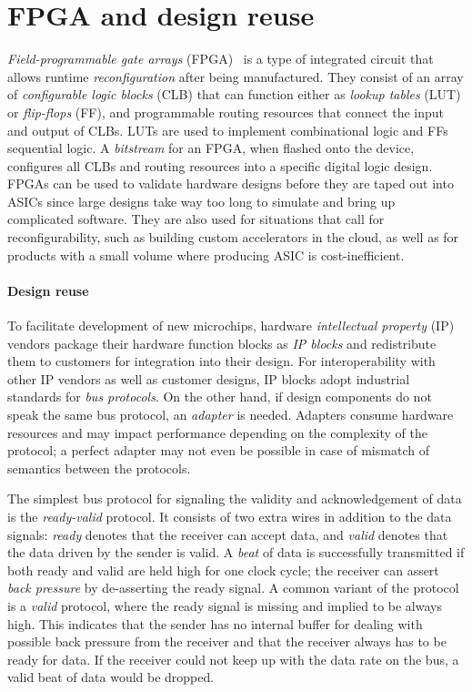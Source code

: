 \section{FPGA and design reuse} \label{sec:fpga-basics}

\emph{Field-programmable gate arrays} (FPGA)~\cite{brown_field-programmable_1992} is a type of integrated circuit that allows runtime \emph{reconfiguration} after being manufactured.  They consist of an array of \emph{configurable logic blocks} (CLB) that can function either as \emph{lookup tables} (LUT) or \emph{flip-flops} (FF), and programmable routing resources that connect the input and output of CLBs.  LUTs are used to implement combinational logic and FFs sequential logic.  A \emph{bitstream} for an FPGA, when flashed onto the device, configures all CLBs and routing resources into a specific digital logic design.  FPGAs can be used to validate hardware designs before they are taped out into ASICs since large designs take way too long to simulate and bring up complicated software.  They are also used for situations that call for reconfigurability, such as building custom accelerators in the cloud, as well as for products with a small volume where producing ASIC is cost-inefficient.

\paragraph{Design reuse} To facilitate development of new microchips, hardware \emph{intellectual property} (IP) vendors package their hardware function blocks as \emph{IP blocks} and redistribute them to customers for integration into their design.  For interoperability with other IP vendors as well as customer designs, IP blocks adopt industrial standards for \emph{bus protocols}.  On the other hand, if design components do not speak the same bus protocol, an \emph{adapter} is needed.  Adapters consume hardware resources and may impact performance depending on the complexity of the protocol; a perfect adapter may not even be possible in case of mismatch of semantics between the protocols.

The simplest bus protocol for signaling the validity and acknowledgement of data is the \emph{ready-valid} protocol.  It consists of two extra wires in addition to the data signals: \emph{ready} denotes that the receiver can accept data, and \emph{valid} denotes that the data driven by the sender is valid.  A \emph{beat} of data is successfully transmitted if both ready and valid are held high for one clock cycle; the receiver can assert \emph{back pressure} by de-asserting the ready signal.  A common variant of the protocol is a \emph{valid} protocol, where the ready signal is missing and implied to be always high.  This indicates that the sender has no internal buffer for dealing with possible back pressure from the receiver and that the receiver always has to be ready for data.  If the receiver could not keep up with the data rate on the bus, a valid beat of data would be dropped.

